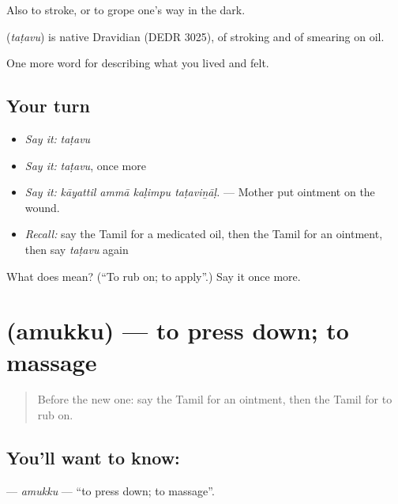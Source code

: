 Also to stroke, or to grope one’s way in the dark.

\begin{cousinweb}
\textbf{} (\emph{taṭavu}) is native Dravidian (DEDR 3025), of stroking and of smearing on oil.
\end{cousinweb}

\begin{grammarlens}[title={What you've built}]
One more word for describing what you lived and felt.
\end{grammarlens}

\subsection*{Your turn}
\begin{itemize}
\raggedright
  \item \emph{Say it:} \emph{taṭavu}
  \item \emph{Say it:} \emph{taṭavu}, once more
  \item \emph{Say it:} \emph{kāyattil ammā kaḷimpu taṭaviṉāḷ.} — Mother put ointment on the wound.
  \item \emph{Recall:} say the Tamil for a medicated oil, then the Tamil for an ointment, then say \emph{taṭavu} again
\end{itemize}

\begin{tcolorbox}[breakable,colback=teal!4,colframe=teal!35!black,title={Before you move on}]
What does  mean? (\textquotedblleft{}To rub on; to apply\textquotedblright{}.) Say it once more.
\end{tcolorbox}
\section[\texorpdfstring{\ta{அமுக்கு} (amukku)}{அமுக்கு (amukku)}]{ (amukku) — to press down; to massage}

\label{lesson:TA-C486-amukku}



\begin{quote}
Before the new one: say the Tamil for an ointment, then the Tamil for to rub on.
\end{quote}

\subsection*{You'll want to know: }
\textbf{} — \emph{amukku} — \textquotedblleft{}to press down; to massage\textquotedblright{}.

